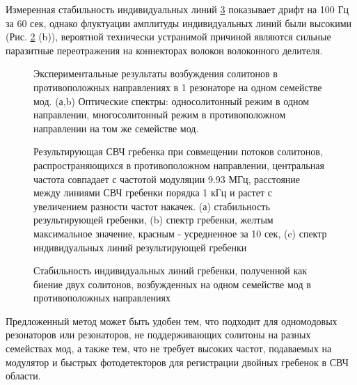 Измеренная стабильность индивидуальных линий \ref{cp_one_family_stability} показывает дрифт на 100 Гц за 60 сек, однако флуктуации амплитуды индивидуальных линий были высокими (Рис. \ref{cp_one_family_dual_comb} (b)), вероятной технически устранимой причиной являются сильные паразитные переотражения на коннекторах волокон волоконного делителя.

\begin{figure}[ht]
\begin{minipage}[ht]{1\linewidth}
\end{minipage}
\caption{Экспериментальные результаты возбуждения солитонов в противоположных направлениях в 1 резонаторе на одном семействе мод. (а,b) Оптические спектры: односолитонный режим в одном направлении, многосолитонный режим в противоположном направлении на том же семействе мод.}
\label{cp_one_family}
\end{figure}

\begin{figure}[ht]
\begin{minipage}[ht]{1\linewidth}
\end{minipage}
\caption{Результирующая СВЧ гребенка при совмещении потоков солитонов, распространяющихся в противоположном направлении, центральная частота совпадает с частотой модуляции 9.93 МГц, расстояние между линиями СВЧ гребенки порядка 1 кГц и растет с увеличением разности частот накачек. (а) стабильность результирующей гребенки, (b) спектр гребенки, желтым максимальное значение, красным - усредненное за 10 сек, (c) спектр индивидуальных линий результирующей гребенки}
\label{cp_one_family_dual_comb}
\end{figure}

\begin{figure}[ht]
\begin{minipage}[ht]{1\linewidth}
\end{minipage}
\caption{Стабильность индивидуальных линий гребенки, полученной как биение двух солитонов, возбужденных на одном семействе мод в противоположных направлениях}
\label{cp_one_family_stability}
\end{figure}

Предложенный метод может быть удобен тем, что подходит для одномодовых резонаторов или резонаторов, не поддерживающих солитоны на разных семействах мод, а также тем, что не требует высоких частот, подаваемых на модулятор и быстрых фотодетекторов для регистрации двойных гребенок в СВЧ области.